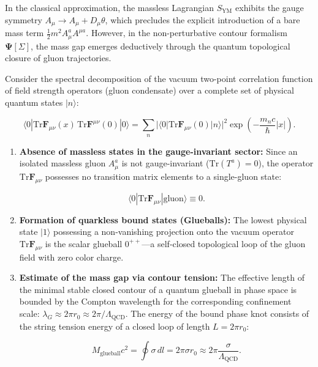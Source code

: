 \documentclass[11pt,a4paper]{article}
\theoremstyle{definition}
\begin{document}
In the classical approximation, the massless Lagrangian $S_{\text{YM}}$ exhibits the gauge symmetry $A_\mu \to A_\mu + D_\mu \theta$, which precludes the explicit introduction of a bare mass term $\frac{1}{2} m^2 A_\mu^a A^{\mu a}$. However, in the non-perturbative contour formalism $\mathbf{\Psi}[\Sigma]$, the mass gap emerges deductively through the quantum topological closure of gluon trajectories.

Consider the spectral decomposition of the vacuum two-point correlation function of field strength operators (gluon condensate) over a complete set of physical quantum states $|n\rangle$:

\begin{equation}\label{eq:2.3.35}\tag{2.3.35}
\langle 0 | \text{Tr}\mathbf{F}_{\mu\nu}(x) \, \text{Tr}\mathbf{F}^{\mu\nu}(0) | 0 \rangle = \sum_{n} |\langle 0 | \text{Tr}\mathbf{F}_{\mu\nu}(0) | n \rangle|^2 \exp\left( - \frac{m_n c}{\hbar} |x| \right).
\end{equation}

\begin{enumerate}
\item \textbf{Absence of massless states in the gauge-invariant sector:}  
Since an isolated massless gluon $A_\mu^a$ is not gauge-invariant ($\text{Tr}(T^a) = 0$), the operator $\text{Tr}\mathbf{F}_{\mu\nu}$ possesses no transition matrix elements to a single-gluon state:

\begin{equation}\label{eq:2.3.36}\tag{2.3.36}
\langle 0 | \text{Tr}\mathbf{F}_{\mu\nu} | \text{gluon} \rangle \equiv 0.
\end{equation}

\item \textbf{Formation of quarkless bound states (Glueballs):}  
The lowest physical state $|1\rangle$ possessing a non-vanishing projection onto the vacuum operator $\text{Tr}\mathbf{F}_{\mu\nu}$ is the scalar glueball $0^{++}$---a self-closed topological loop of the gluon field with zero color charge.

\item \textbf{Estimate of the mass gap via contour tension:}  
The effective length of the minimal stable closed contour of a quantum glueball in phase space is bounded by the Compton wavelength for the corresponding confinement scale: $\lambda_G \approx 2\pi r_0 \approx 2\pi / \Lambda_{\text{QCD}}$.  
The energy of the bound phase knot consists of the string tension energy of a closed loop of length $L = 2\pi r_0$:

\begin{equation}\label{eq:2.3.37}\tag{2.3.37}
M_{\text{glueball}} c^2 = \oint \sigma \, dl = 2\pi \sigma r_0 \approx 2\pi \frac{\sigma}{\Lambda_{\text{QCD}}}.
\end{equation}
\end{enumerate}
\end{document}
